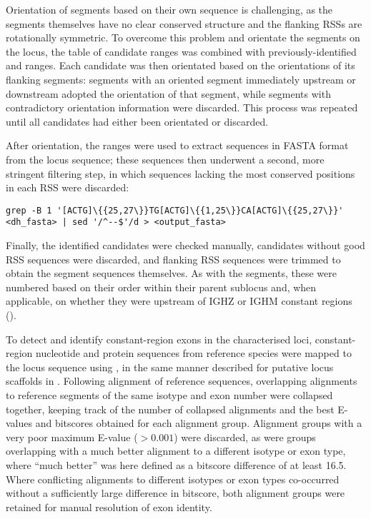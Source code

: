 Orientation of \dh segments based on their own sequence is challenging, as the segments themselves have no clear conserved structure and the flanking RSSs are rotationally symmetric. To overcome this problem and orientate the \dh segments on the locus, the table of \dh candidate ranges was combined with previously-identified \vh and \jh ranges. Each \dh candidate was then orientated based on the orientations of its flanking segments: segments with an oriented segment immediately upstream or downstream adopted the orientation of that segment, while segments with contradictory orientation information were discarded. This process was repeated until all \dh candidates had either been orientated or discarded.

After orientation, the \dh ranges were used to extract \dh sequences in FASTA format from the locus sequence; these sequences then underwent a second, more stringent filtering step, in which sequences lacking the most conserved positions in each RSS \parencite{hesse1989rss} were discarded:

\begin{lstlisting}
grep -B 1 '[ACTG]\{{25,27\}}TG[ACTG]\{{1,25\}}CA[ACTG]\{{25,27\}}' <dh_fasta> | sed '/^--$'/d > <output_fasta>
\end{lstlisting}

Finally, the identified \dh candidates were checked manually, candidates without good RSS sequences were discarded, and flanking RSS sequences were trimmed to obtain the \dh segment sequences themselves. As with the \jh segments, these were numbered based on their order within their parent sublocus and, when applicable, on whether they were upstream of IGHZ or IGHM constant regions ().


\noindent To detect and identify constant-region exons in the characterised loci, constant-region nucleotide and protein sequences from reference species were mapped to the locus sequence using  \parencite{altschul1990blast,altschul1997blast}, in the same manner described for putative locus scaffolds in .
Following alignment of reference sequences, overlapping alignments to reference segments of the same isotype and exon number were collapsed together, keeping track of the number of collapsed alignments and the best E-values and bitscores obtained for each alignment group. Alignment groups with a very poor maximum E-value ($> 0.001$) were discarded, as were groups overlapping with a much better alignment to a different isotype or exon type, where ``much better'' was here defined as a bitscore difference of at least 16.5. Where conflicting alignments to different isotypes or exon types co-occurred without a sufficiently large difference in bitscore, both alignment groups were retained for manual resolution of exon identity.

